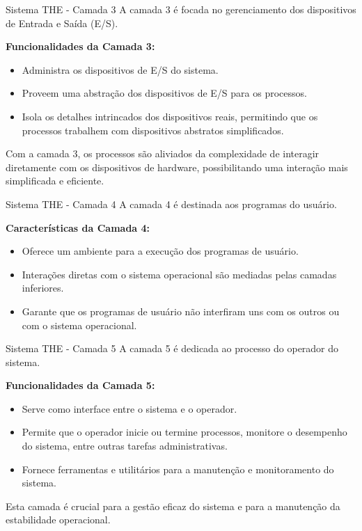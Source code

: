\documentclass{beamer}
\begin{document}
\begin{frame}{Sistema THE -  Camada 3}
    A camada 3 é focada no gerenciamento dos dispositivos de Entrada e Saída (E/S).

    \vspace{0.5cm}

    \textbf{Funcionalidades da Camada 3:}
    \begin{itemize}
        \item Administra os dispositivos de E/S do sistema.
        \item Proveem uma abstração dos dispositivos de E/S para os processos.
        \item Isola os detalhes intrincados dos dispositivos reais, permitindo que os processos trabalhem com dispositivos abstratos simplificados.
    \end{itemize}

    \vspace{0.5cm}

    Com a camada 3, os processos são aliviados da complexidade de interagir diretamente com os dispositivos de hardware, possibilitando uma interação mais simplificada e eficiente.
\end{frame}

\begin{frame}{Sistema THE - Camada 4}
    A camada 4 é destinada aos programas do usuário.

    \vspace{0.5cm}

    \textbf{Características da Camada 4:}
    \begin{itemize}
        \item Oferece um ambiente para a execução dos programas de usuário.
        \item Interações diretas com o sistema operacional são mediadas pelas camadas inferiores.
        \item Garante que os programas de usuário não interfiram uns com os outros ou com o sistema operacional.
    \end{itemize}
\end{frame}
\begin{frame}{Sistema THE - Camada 5}
    A camada 5 é dedicada ao processo do operador do sistema.

    \vspace{0.5cm}

    \textbf{Funcionalidades da Camada 5:}
    \begin{itemize}
        \item Serve como interface entre o sistema e o operador.
        \item Permite que o operador inicie ou termine processos, monitore o desempenho do sistema, entre outras tarefas administrativas.
        \item Fornece ferramentas e utilitários para a manutenção e monitoramento do sistema.
    \end{itemize}

    \vspace{0.5cm}

    Esta camada é crucial para a gestão eficaz do sistema e para a manutenção da estabilidade operacional.
\end{frame}
\end{document}
